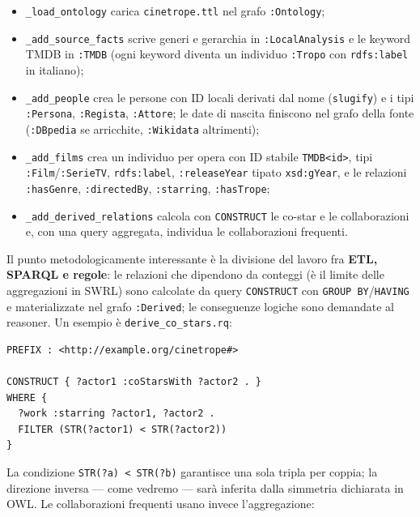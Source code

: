 \documentclass[a4paper,11pt]{article}
\newcommand{\code}[1]{\texttt{#1}}
\begin{document}
\begin{itemize}[nosep]
  \item \code{\_load\_ontology} carica \code{cinetrope.ttl} nel grafo
        \code{:Ontology};
  \item \code{\_add\_source\_facts} scrive generi e gerarchia in
        \code{:LocalAnalysis} e le keyword TMDB in \code{:TMDB} (ogni
        keyword diventa un individuo \code{:Tropo} con \code{rdfs:label}
        in italiano);
  \item \code{\_add\_people} crea le persone con ID locali derivati dal nome
        (\code{slugify}) e i tipi \code{:Persona}, \code{:Regista},
        \code{:Attore}; le date di nascita finiscono nel grafo della fonte
        (\code{:DBpedia} se arricchite, \code{:Wikidata} altrimenti);
  \item \code{\_add\_films} crea un individuo per opera con ID stabile
        \code{TMDB<id>}, tipi \code{:Film}/\code{:SerieTV},
        \code{rdfs:label}, \code{:releaseYear} tipato \code{xsd:gYear},
        e le relazioni \code{:hasGenre}, \code{:directedBy},
        \code{:starring}, \code{:hasTrope};
  \item \code{\_add\_derived\_relations} calcola con \code{CONSTRUCT} le
        co-star e le collaborazioni e, con una query aggregata, individua
        le collaborazioni frequenti.
\end{itemize}

Il punto metodologicamente interessante \`e la divisione del lavoro fra
\textbf{ETL, SPARQL e regole}: le relazioni che dipendono da conteggi
(\`e il limite delle aggregazioni in SWRL) sono calcolate da query
\code{CONSTRUCT} con \code{GROUP BY}/\code{HAVING} e materializzate nel
grafo \code{:Derived}; le conseguenze logiche sono demandate al reasoner.
Un esempio \`e \code{derive\_co\_stars.rq}:

\begin{lstlisting}[style=sparql, caption={Materializzazione ETL delle
co-star (una sola direzione, per mostrare l'inferenza OWL).}]
PREFIX : <http://example.org/cinetrope#>

CONSTRUCT { ?actor1 :coStarsWith ?actor2 . }
WHERE {
  ?work :starring ?actor1, ?actor2 .
  FILTER (STR(?actor1) < STR(?actor2))
}
\end{lstlisting}

La condizione \code{STR(?a) < STR(?b)} garantisce una sola tripla per
coppia; la direzione inversa --- come vedremo --- sar\`a inferita dalla
simmetria dichiarata in OWL. Le collaborazioni frequenti usano invece
l'aggregazione:
\end{document}
